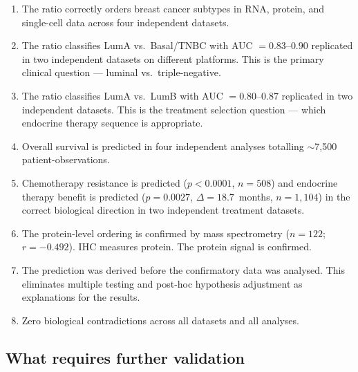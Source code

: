 \documentclass[12pt, a4paper]{article}
\begin{document}
\begin{enumerate}
  \item The ratio correctly orders breast cancer subtypes
        in RNA, protein, and single-cell data across
        four independent datasets.

  \item The ratio classifies LumA vs.\ Basal/TNBC with
        AUC $= 0.83$--$0.90$ replicated in two independent
        datasets on different platforms. This is the primary
        clinical question --- luminal vs.\ triple-negative.

  \item The ratio classifies LumA vs.\ LumB with
        AUC $= 0.80$--$0.87$ replicated in two independent
        datasets. This is the treatment selection question
        --- which endocrine therapy sequence is appropriate.

  \item Overall survival is predicted in four independent
        analyses totalling $\sim$7,500 patient-observations.

  \item Chemotherapy resistance is predicted ($p < 0.0001$,
        $n = 508$) and endocrine therapy benefit is predicted
        ($p = 0.0027$, $\Delta = 18.7$~months, $n = 1{,}104$)
        in the correct biological direction in two independent
        treatment datasets.

  \item The protein-level ordering is confirmed by mass
        spectrometry ($n = 122$; $r = -0.492$). IHC measures
        protein. The protein signal is confirmed.

  \item The prediction was derived before the confirmatory
        data was analysed. This eliminates multiple testing
        and post-hoc hypothesis adjustment as explanations
        for the results.

  \item Zero biological contradictions across all datasets
        and all analyses.
\end{enumerate}

\subsection{What requires further validation}
\end{document}
